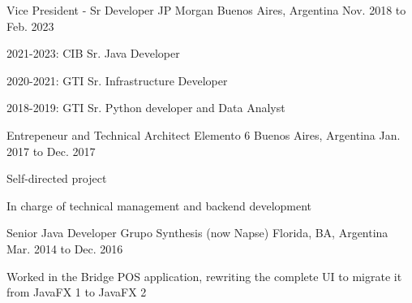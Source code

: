 


\begin{cventries}


	\cventry
	{Vice President - Sr Developer} %
	{JP Morgan} %
	{Buenos Aires, Argentina} %
	{Nov. 2018 to Feb. 2023} %
	{ %
		\begin{cvitems}
			\item {2021-2023: CIB Sr. Java Developer}
			\item {2020-2021: GTI Sr. Infrastructure Developer}
			\item {2018-2019: GTI Sr. Python developer and Data Analyst}
		\end{cvitems}
	}


	\cventry
	{Entrepeneur and Technical Architect} %
	{Elemento 6} %
	{Buenos Aires, Argentina} %
	{Jan. 2017 to Dec. 2017} %
	{ %
		\begin{cvitems}
			\item {Self-directed project}
			\item {In charge of technical management and backend development}
		\end{cvitems}
	}


	\cventry
	{Senior Java Developer} %
	{Grupo Synthesis (now Napse)} %
	{Florida, BA, Argentina} %
	{Mar. 2014 to Dec. 2016} %
	{ %
		\begin{cvitems}
			\item {Worked in the Bridge POS application, rewriting the complete UI to migrate it from JavaFX 1 to JavaFX 2 }
		\end{cvitems}
	}


\end{cventries}
